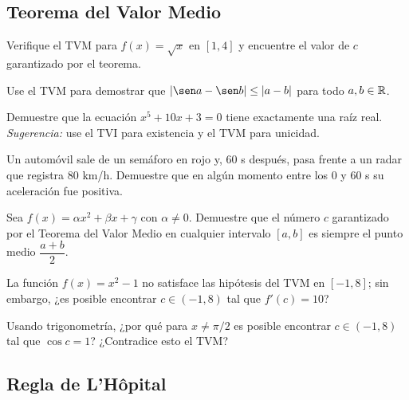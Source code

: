 \subsection{Teorema del Valor Medio}

\begin{prob}
Verifique el TVM para $f(x)=\sqrt{x}$ en $[1,4]$ y encuentre el valor
de $c$ garantizado por el teorema.
\end{prob}

\begin{prob}
Use el TVM para demostrar que $|\sen a - \sen b| \leq |a-b|$ para
todo $a,b\in{\mathbb R}$.
\end{prob}

\begin{prob}
Demuestre que la ecuación $x^5+10x+3=0$ tiene exactamente una raíz
real. \textit{Sugerencia:} use el TVI para existencia y el TVM para
unicidad.
\end{prob}

\begin{prob}
Un automóvil sale de un semáforo en rojo y, $60$ s después, pasa
frente a un radar que registra $80$ km/h. Demuestre que en algún
momento entre los $0$ y $60$ s su aceleración fue positiva.
\end{prob}

\begin{prob}
Sea $f(x)=\alpha x^2+\beta x+\gamma$ con $\alpha\neq 0$. Demuestre que
el número $c$ garantizado por el Teorema del Valor Medio en cualquier
intervalo $[a,b]$ es siempre el punto medio $\dfrac{a+b}{2}$.
\end{prob}

\begin{prob}
La función $f(x)=x^2-1$ no satisface las hipótesis del TVM
    en $[-1,8]$; sin embargo, ¿es posible encontrar $c\in(-1,8)$ tal
    que $f'(c)=10$?
    \end{prob}
    \begin{prob}
Usando trigonometría, ¿por qué para $x\neq\pi/2$ es posible
    encontrar $c\in(-1,8)$ tal que $\cos c=1$? ¿Contradice esto el TVM?
\end{prob}


\subsection{Regla de L'Hôpital}

